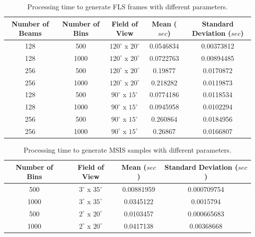 \documentclass[final,5p,times]{elsarticle}
\begin{document}
\begin{table}[htb]
    \caption{Processing time to generate FLS frames with different parameters.}
    \label{table:fls}
    \begin{center}
        \begin{tabular}{| c | c | c | c | c |}
            \hline
            Number of Beams & Number of Bins & Field of View & Mean ($sec$) & Standard Deviation ($sec$) \\
            \hline
            128     & 500       & $120^{\circ}$ x $20^{\circ}$        & 0.0546834   & 0.00373812  \\ \hline
            128     & 1000      & $120^{\circ}$ x $20^{\circ}$        & 0.0722763	& 0.00894485  \\ \hline
            256     & 500       & $120^{\circ}$ x $20^{\circ}$        & 0.19877	    & 0.0170872   \\ \hline
            256     & 1000      & $120^{\circ}$ x $20^{\circ}$        & 0.218282	& 0.0119873   \\ \hline
            128     & 500       & $90^{\circ}$ x $15^{\circ}$         & 0.0774186	& 0.0118534   \\ \hline
            128     & 1000      & $90^{\circ}$ x $15^{\circ}$         & 0.0945958	& 0.0102294   \\ \hline
            256     & 500       & $90^{\circ}$ x $15^{\circ}$         & 0.260864	& 0.0184956   \\ \hline
            256     & 1000      & $90^{\circ}$ x $15^{\circ}$         & 0.26867	    & 0.0166807   \\ \hline
        \end{tabular}
    \end{center}
\end{table}

\begin{table}
    \caption{Processing time to generate MSIS samples with different parameters.}
    \label{table:msis}
    \begin{center}
        \begin{tabular}{| c | c | c | c |}
            \hline
            Number of Bins & Field of View & Mean ($sec$) & Standard Deviation ($sec$) \\
            \hline
            500       & $3^{\circ}$ x $35^{\circ}$        & 0.00881959	& 0.000709754  \\ \hline
            1000      & $3^{\circ}$ x $35^{\circ}$        & 0.0345122	& 0.0015794    \\ \hline
            500       & $2^{\circ}$ x $20^{\circ}$        & 0.0103457	& 0.000665683  \\ \hline
            1000      & $2^{\circ}$ x $20^{\circ}$        & 0.0417138	& 0.00368668   \\ \hline
        \end{tabular}
    \end{center}
\end{table}
\end{document}
